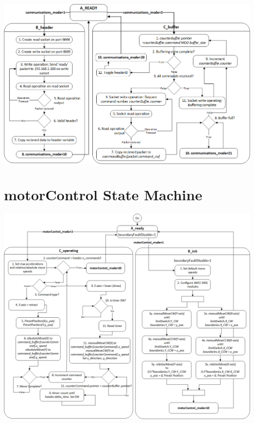 	\begin{center}
		\includegraphics[width=\textwidth]{figures/cncMachine/communications}
		\label{fig:communicationsStates}
	\end{center}

\section{motorControl State Machine}
\label{sec:PLC-flowcharts-motor}
	\begin{center}
		\includegraphics[width=\textwidth]{figures/cncMachine/motorControl}
		\label{fig:motorControlStates}
	\end{center}


